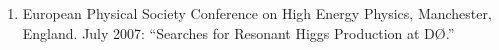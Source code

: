 \documentclass[amsmath,amssymb]{revtex4}
\def\dzero{D\O}
\begin{document}
\begin{enumerate}
\item European Physical Society Conference on High Energy Physics, Manchester, England.  July 2007:
``Searches for Resonant Higgs Production at \dzero.''
\end{enumerate}
\end{document}
